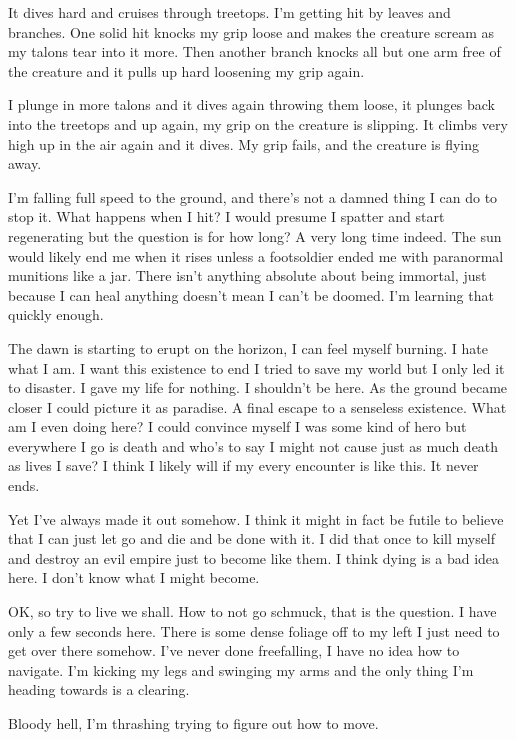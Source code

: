 It dives hard and cruises through treetops. I'm getting hit by leaves and branches. One solid hit knocks my grip loose and makes the creature scream as my talons tear into it more. Then another branch knocks all but one arm free of the creature and it pulls up hard loosening my grip again.

I plunge in more talons and it dives again throwing them loose, it plunges back into the treetops and up again, my grip on the creature is slipping. It climbs very high up in the air again and it dives. My grip fails, and the creature is flying away.

I'm falling full speed to the ground, and there's not a damned thing I can do to stop it. What happens when I hit? I would presume I spatter and start regenerating but the question is for how long? A very long time indeed. The sun would likely end me when it rises unless a footsoldier ended me with paranormal munitions like a jar. There isn't anything absolute about being immortal, just because I can heal anything doesn't mean I can't be doomed. I'm learning that quickly enough.

The dawn is starting to erupt on the horizon, I can feel myself burning. I hate what I am. I want this existence to end I tried to save my world but I only led it to disaster. I gave my life for nothing. I shouldn't be here. As the ground became closer I could picture it as paradise. A final escape to a senseless existence. What am I even doing here? I could convince myself I was some kind of hero but everywhere I go is death and who's to say I might not cause just as much death as lives I save? I think I likely will if my every encounter is like this. It never ends.

Yet I've always made it out somehow. I think it might in fact be futile to believe that I can just let go and die and be done with it. I did that once to kill myself and destroy an evil empire just to become like them. I think dying is a bad idea here. I don't know what I might become.

OK, so try to live we shall. How to not go schmuck, that is the question. I have only a few seconds here. There is some dense foliage off to my left I just need to get over there somehow. I've never done freefalling, I have no idea how to navigate. I'm kicking my legs and swinging my arms and the only thing I'm heading towards is a clearing.

Bloody hell, I'm thrashing trying to figure out how to move.

